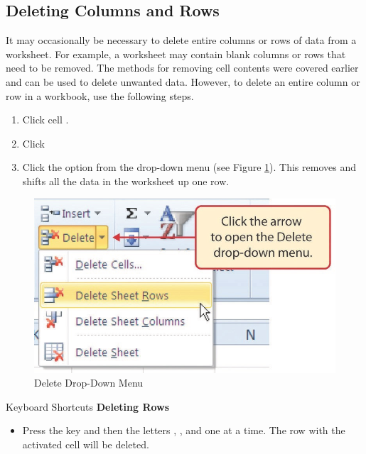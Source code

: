 \subsection{Deleting Columns and Rows}

It may occasionally be necessary to delete entire columns or rows of data from a worksheet. For example, a worksheet may contain blank columns or rows that need to be removed. The methods for removing cell contents were covered earlier and can be used to delete unwanted data. However, to delete an entire column or row in a workbook, use the following steps.

\begin{enumbox}
	\begin{enumerate}
		\item Click cell .
		\item Click 
		\item Click the  option from the drop-down menu (see Figure \ref{01:fig31}). This removes  and shifts all the data in the worksheet up one row.
	\end{enumerate}
\end{enumbox}
	
\begin{figure}[H]
	\centering
	\includegraphics[width=\maxwidth{.95\linewidth}]{gfx/ch01_fig31}
	\caption{Delete Drop-Down Menu}
	\label{01:fig31}
\end{figure}

\begin{center}
	\begin{shtcutbox}{Keyboard Shortcuts}
		\textbf{Deleting Rows}
		\\
		\begin{itemize}
			\setlength{\itemsep}{0pt}
			\setlength{\parskip}{0pt}
			\setlength{\parsep}{0pt}
			
			\item Press the  key and then the letters , , and  one at a time. The row with the activated cell will be deleted.
			
		\end{itemize}
	\end{shtcutbox}
\end{center}

